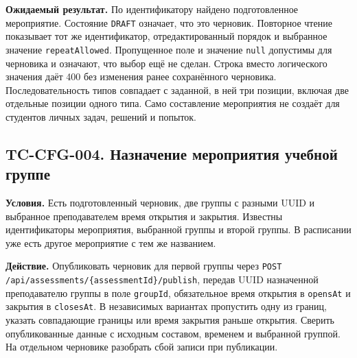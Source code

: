 \documentclass[12pt,a4paper]{article}
\begin{document}
\textbf{Ожидаемый результат.} По идентификатору найдено подготовленное мероприятие. Состояние \texttt{DRAFT} означает, что это черновик. Повторное чтение показывает тот же идентификатор, отредактированный порядок и выбранное значение \texttt{repeat\allowbreak{}Allowed}. Пропущенное поле и значение \texttt{null} допустимы для черновика и означают, что выбор ещё не сделан. Строка вместо логического значения даёт 400 без изменения ранее сохранённого черновика. Последовательность типов совпадает с заданной, в ней три позиции, включая две отдельные позиции одного типа. Само составление мероприятия не создаёт для студентов личных задач, решений и попыток.

\subsection{TC-CFG-004. Назначение мероприятия учебной группе}\label{tc-cfg-004-ux43dux430ux437ux43dux430ux447ux435ux43dux438ux435-ux43cux435ux440ux43eux43fux440ux438ux44fux442ux438ux44f-ux443ux447ux435ux431ux43dux43eux439-ux433ux440ux443ux43fux43fux435}

\hypertarget{tc-cfg-004-назначение-мероприятия-учебной-группе}{}

\hypertarget{tc-cfg-004}{}

\textbf{Условия.} Есть подготовленный черновик, две группы с разными UUID и выбранное преподавателем время открытия и закрытия. Известны идентификаторы мероприятия, выбранной группы и второй группы. В расписании уже есть другое мероприятие с тем же названием.

\textbf{Действие.} Опубликовать черновик для первой группы через \texttt{POST /\allowbreak{}api/\allowbreak{}assessments/\allowbreak{}\{assessment\allowbreak{}Id\}/\allowbreak{}publish}, передав UUID назначенной преподавателю группы в поле \texttt{groupId}, обязательное время открытия в \texttt{opensAt} и закрытия в \texttt{closesAt}. В независимых вариантах пропустить одну из границ, указать совпадающие границы или время закрытия раньше открытия. Сверить опубликованные данные с исходным составом, временем и выбранной группой. На отдельном черновике разобрать сбой записи при публикации.
\end{document}
